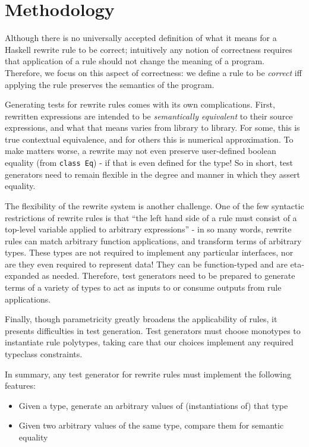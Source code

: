 \section{Methodology}
\label{sec:methodology}

Although there is no universally accepted definition of what it means for a
Haskell rewrite rule to be correct; intuitively any notion of correctness
requires that application of a rule should not change the meaning of a program.
Therefore, we focus on this aspect of correctness: we define a rule to be
\textit{correct} iff applying the rule preserves the semantics of the program.

Generating tests for rewrite rules comes with its own complications. First, rewritten expressions are intended to be \textit{semantically equivalent} to their source expressions, and what that means varies from library to library. For some, this is true contextual equivalence, and for others this is numerical approximation. To make matters worse, a rewrite may not even preserve user-defined boolean equality (from \texttt{class Eq}) - if that is even defined for the type! So in short, test generators need to remain flexible in the degree and manner in which they assert equality.

The flexibility of the rewrite system is another challenge. One of the few syntactic restrictions of rewrite rules is that ``the left hand side of a rule must consist of a top-level variable applied to arbitrary expressions'' \cite{userguide} - in so many words, rewrite rules can match arbitrary function applications, and transform terms of arbitrary types. These types are not required to implement any particular interfaces, nor are they even required to represent data! They can be function-typed and are eta-expanded as needed. Therefore, test generators need to be prepared to generate terms of a variety of types to act as inputs to or consume outputs from rule applications.

Finally, though parametricity greatly broadens the applicability of rules, it presents difficulties in test generation. Test generators must choose monotypes to instantiate rule polytypes, taking care that our choices implement any required typeclass constraints.

In summary, any test generator for rewrite rules must implement the following features:

\begin{itemize}
  \item Given a type, generate an arbitrary values of (instantiations of) that type
  \item Given two arbitrary values of the same type, compare them for semantic equality
\end{itemize}
